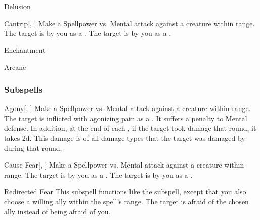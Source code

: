 \newpage
\begin{spellsection}{Delusion}

\begin{spellheader}
\end{spellheader}


\begin{ability}{Cantrip}[, ]
Make a Spellpower vs. Mental attack against a creature within \rngmed range.
\hit The target is  by you as a .
\crit The target is  by you as a .
\end{ability}




 Enchantment

 Arcane
\end{spellsection}


\subsubsection{Subspells}


\begin{ability}[\nth{1}]{Agony}[, ]
Make a Spellpower vs. Mental attack against a creature within \rngmed range.
\hit The target is inflicted with agonizing pain as a .
It suffers a  penalty to Mental defense.
In addition, at the end of each , if the target took damage that round, it takes  \minus2d.
This damage is of all damage types that the target was damaged by during that round.
\end{ability}
\vspace{0.25em}


\begin{ability}[\nth{1}]{Cause Fear}[, ]
Make a Spellpower vs. Mental attack against a creature within \rngmed range.
\hit The target is \frightened by you as a .
\crit The target is \panicked by you as a .
\end{ability}
\vspace{0.25em}


\begin{ability}[\nth{2}]{Redirected Fear}
This subspell functions like the  subspell, except that you also choose a willing ally within the spell's range.
The target is afraid of the chosen ally instead of being afraid of you.
\end{ability}
\vspace{0.25em}


